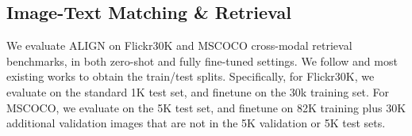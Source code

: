 \documentclass{article}
\begin{document}
\begin{table}[t]
\centering
\small
\caption{Spearman's R Bootstrap Correlation ($\times 100$) on Crisscrossed Captions~(CxC) dataset. ALIGN is compared with VSE++~\cite{faghri:vse++}, VSRN~\cite{li:vsrn}, DE\textsubscript{I2T}~\cite{parekh:cxc}, and DE\textsubscript{T2T+I2T}~\cite{parekh:cxc}.}
\label{tab:cxc_spearman_corr}
\vspace{2mm}
\vspace{-5mm}
\end{table}

\vspace{-2mm}
\subsection{Image-Text Matching \& Retrieval}

We evaluate ALIGN on Flickr30K and MSCOCO cross-modal retrieval benchmarks, in both zero-shot and fully fine-tuned settings. We follow \cite{karpathy:image-text2015} and most existing works to obtain the train/test splits. Specifically, for Flickr30K, we evaluate on the standard 1K test set, and finetune on the 30k training set. For MSCOCO, we evaluate on the 5K test set, and finetune on 82K training plus 30K additional validation images that are not in the 5K validation or 5K test sets.
\end{document}
